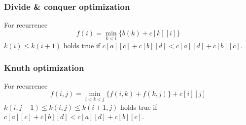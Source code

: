 \subsubsection{Divide \& conquer optimization}
	For recurrence 
	$$f(i) = \min_{k<i}\{b(k)+c[k][i]\}$$
	$k(i) \leq k(i+1)$ holds true if $c[a][c]+c[b][d]<c[a][d]+c[b][c]$.
\subsubsection{Knuth optimization}
	For recurrence
	$$f(i,j) = \min_{i<k<j}\{f(i,k)+f(k,j)\}+c[i][j]$$
	$k(i,j-1) \leq k(i,j) \leq k(i+1,j)$ holds true if $c[a][c]+c[b][d]<c[a][d]+c[b][c]$.

